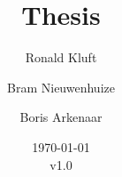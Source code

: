 \documentclass{report}
\begin{document}
\title{Thesis}
\author{Ronald Kluft \and Bram Nieuwenhuize \and Boris Arkenaar}
\date{\today\\v1.0}
\maketitle
\tableofcontents





\printglossaries
\end{document}
